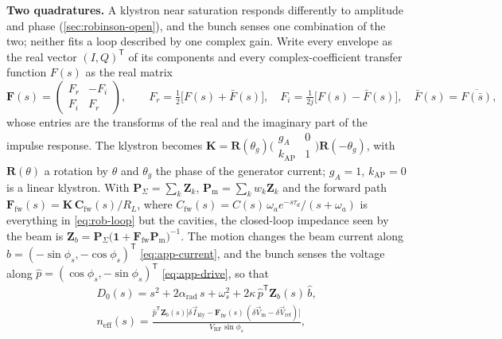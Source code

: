 \textbf{Two quadratures.} A klystron near saturation responds differently to amplitude and phase (\cref{sec:robinson-open}), and the bunch senses one combination of the two; neither fits a loop described by one complex gain. Write every envelope as the real vector \((I, Q)^\mathsf{T}\) of its components and every complex-coefficient transfer function \(F(s)\) as the real matrix
\begin{equation}\label{eq:app-real}
\mathbf{F}(s) = \begin{pmatrix} F_r & -F_i \\ F_i & F_r \end{pmatrix},
\qquad
F_r = \tfrac{1}{2}\bigl[F(s) + \bar F(s)\bigr],\quad
F_i = \tfrac{1}{2j}\bigl[F(s) - \bar F(s)\bigr],\quad
\bar F(s) = \overline{F(\bar s)},
\end{equation}
whose entries are the transforms of the real and the imaginary part of the impulse response. The klystron becomes \(\mathbf{K} = \mathbf{R}(\theta_g)\bigl(\begin{smallmatrix} g_A & 0 \\ k_\text{AP} & 1\end{smallmatrix}\bigr)\mathbf{R}(-\theta_g)\), with \(\mathbf{R}(\theta)\) a rotation by \(\theta\) and \(\theta_g\) the phase of the generator current; \(g_A = 1\), \(k_\text{AP} = 0\) is a linear klystron. With \(\mathbf{P}_\Sigma = \sum_k \mathbf{Z}_k\), \(\mathbf{P}_\text{m} = \sum_k w_k\mathbf{Z}_k\) and the forward path \(\mathbf{F}_\text{fw}(s) = \mathbf{K}\,\mathbf{C}_\text{fw}(s)/R_L\), where \(C_\text{fw}(s) = C(s)\,\omega_a e^{-s\tau_d}/(s + \omega_a)\) is everything in \cref{eq:rob-loop} but the cavities, the closed-loop impedance seen by the beam is \(\mathbf{Z}_b = \mathbf{P}_\Sigma\bigl(\mathbf{1} + \mathbf{F}_\text{fw}\mathbf{P}_\text{m}\bigr)^{-1}\). The motion changes the beam current along \(\hat b = (-\sin\phi_s, -\cos\phi_s)^\mathsf{T}\) \eqref{eq:app-current}, and the bunch senses the voltage along \(\hat p = (\cos\phi_s, -\sin\phi_s)^\mathsf{T}\) \eqref{eq:app-drive}, so that
\begin{equation}\label{eq:app-iq}
\begin{gathered}
D_0(s) = s^2 + 2\alpha_\text{rad}\,s + \omega_s^2 + 2\kappa\,\hat p^\mathsf{T}\mathbf{Z}_b(s)\,\hat b,\\
n_\text{eff}(s) = \frac{\hat p^\mathsf{T}\mathbf{Z}_b(s)\bigl[\delta\vec{I}_\text{kly} - \mathbf{F}_\text{fw}(s)\,(\delta\vec{V}_\text{m} - \delta\vec{V}_\text{ref})\bigr]}{V_\text{RF}\sin\phi_s},
\end{gathered}
\end{equation}
